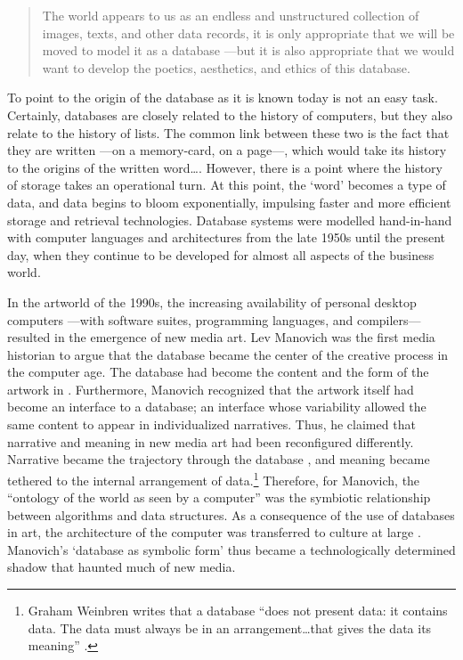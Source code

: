 \begin{quote}
	The world appears to us as an endless and unstructured collection of images, texts, and other data records, it is only appropriate that we will be moved to model it as a database ---but it is also appropriate that we would want to develop the poetics, aesthetics, and ethics of this database. \parencite[219]{Man01:The}
\end{quote}

To point to the origin of the database as it is known today is not an easy task. Certainly, databases are closely related to the history of computers, but they also relate to the history of lists. The common link between these two is the fact that they are written ---on a memory-card, on a page---, which would take its history to the origins of the written word\dots. However, there is a point where the history of storage takes an operational turn. At this point, the `word' becomes a type of data, and data begins to bloom exponentially, impulsing faster and more efficient storage and retrieval technologies. Database systems were modelled hand-in-hand with computer languages and architectures from the late 1950s until the present day, when they continue to be developed for almost all aspects of the business world.

In the artworld of the 1990s, the increasing availability of personal desktop computers ---with software suites, programming languages, and compilers--- resulted in the emergence of new media art. Lev Manovich \parencite{Man01:The} was the first media historian to argue that the database became the center of the creative process in the computer age. The database had become the content and the form of the artwork in . Furthermore, Manovich recognized that the artwork itself had become an interface to a database; an interface whose variability allowed the same content to appear in individualized narratives. Thus, he claimed that narrative and meaning in new media art had been reconfigured differently. Narrative became the trajectory through the database \parencite[227]{Man01:The}, and meaning became tethered to the internal arrangement of data.\footnote{Graham Weinbren writes that a database ``does not present data: it contains data. The data must always be in an arrangement\dots that gives the data its meaning'' \parencite[67-9]{Wei07:Oce}.} Therefore, for Manovich, the ``ontology of the world as seen by a computer'' \parencite[223]{Man01:The} was the symbiotic relationship between algorithms and data structures. As a consequence of the use of databases in art, the architecture of the computer was transferred to culture at large \parencite[235]{Man01:The}. Manovich's `database as symbolic form' thus became a technologically determined shadow that haunted much of new media.
